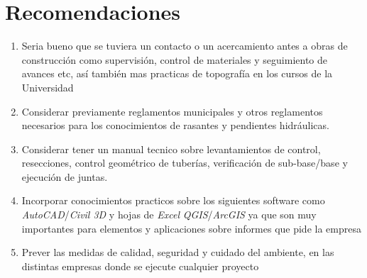 \documentclass[12pt]{article}
\let\oldsection\section
\renewcommand{\section}{\clearpage\oldsection}
\begin{document}
	
	
	
	

	
	\section{Recomendaciones}
	
	\begin{enumerate}
		\item Seria bueno que se tuviera un contacto o un acercamiento antes a obras de construcción como  supervisión, control de materiales y seguimiento de avances etc, así también mas practicas de topografía en los cursos de la Universidad
		\item Considerar previamente reglamentos municipales y otros reglamentos necesarios para los conocimientos de rasantes y pendientes hidráulicas. 
		\item Considerar tener un manual tecnico sobre  levantamientos de control, resecciones, control geométrico de tuberías, verificación de sub-base/base y ejecución de juntas. 
		\item Incorporar conocimientos practicos sobre los siguientes software como  \textit{AutoCAD}/\textit{Civil 3D} y hojas de \textit{Excel}  \textit{QGIS}/\textit{ArcGIS} ya que son muy importantes para elementos y aplicaciones sobre informes  que pide la empresa 
		\item Prever las medidas de calidad, seguridad y cuidado del ambiente, en las distintas empresas donde se ejecute cualquier proyecto 
		
	\end{enumerate}
	
	
	
\end{document}
